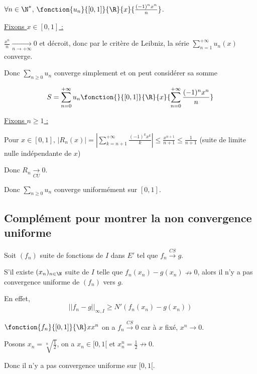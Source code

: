 \begin{exemple}
    $\forall n \in \N^*$, $\fonction{u_n}{[0, 1]}{\R}{x}{\frac{(-1)^n x^n}{n}}$.

    \uline{Fixons $x \in [0, 1]$ :} 
    
    \avspace $\displaystyle \frac{x^n }{n } \xrightarrow[n\to +\infty]{} 0$ et décroit, 
    donc par le critère de Leibniz, la série $\displaystyle \sum_{n = 1}^{ + \infty } u_n(x)$ converge.

    Donc $\displaystyle \sum_{n \geqslant 0} u_n$ converge simplement et on peut considérer sa somme 

    \[S = \sum_{n = 0}^{ + \infty } u_n \fonction{}{[0, 1]}{\R}{x}{\sum_{n = 0}^{ + \infty } \frac{(-1)^n x^n}{n}}\]

    \uline{Fixons $n \geqslant 1$ :} 

    \avspace Pour $x \in [0, 1], \, \displaystyle |R_n(x)| = \left| \sum_{k = n + 1}^{ + \infty } \frac{(-1)^k x^k}{k} \right| \leqslant \frac{x^{n + 1}}{n + 1} \leqslant \frac 1 {n + 1}$ 
    (suite de limite nulle indépendante de $x$)

    Donc $\displaystyle R_n \xrightarrow[CU]{} 0$.

    Donc $\displaystyle \sum_{n \geqslant 0} u_n$ converge uniformément sur $[0, 1]$.
\end{exemple}

\subsection{Complément pour montrer la non convergence uniforme}

\begin{proposition}{}{}
    Soit $(f_n)$ suite de fonctions de $I$ dans $E'$ tel que $f_n \xrightarrow{CS} g$. 

    S'il existe $(x_n)_{n \in \N}$ suite de $I$ telle que 
    $f_n(x_n) - g(x_n) \nrightarrow 0$, alors il n'y a pas convergence uniforme de $(f_n)$ vers $g$.

    En effet, \[||f_n - g||_{\infty, I} \geqslant N'(f_n(x_n) - g(x_n))\]
\end{proposition}

\begin{exemple}
    $\fonction{f_n}{[0, 1]}{\R} x {x^n}$ on a $f_n \xrightarrow{CS} 0$
    car à $x$ fixé, $x^n \to 0$.

    Posons $x_n = \sqrt[n]{\frac 1 2}$, on a $x_n \in [0, 1[$ et 
    $x_n^n = \frac 1 2 \nrightarrow 0$. 

    Donc il n'y a pas convergence uniforme sur $[0, 1[$. 
\end{exemple}


